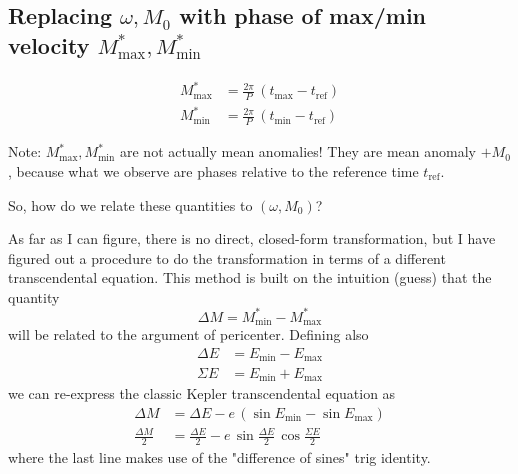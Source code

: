 \documentclass{article}
\begin{document}
\subsection{Replacing $\omega, M_0$ with phase of max/min velocity
$M^*_{\mathrm{max}}, M^*_{\mathrm{min}}$}

\begin{align}
M^*_{\mathrm{max}} &= \frac{2\pi}{P} \, (t_{\mathrm{max}} - t_{\mathrm{ref}}) \\
M^*_{\mathrm{min}} &= \frac{2\pi}{P} \, (t_{\mathrm{min}} - t_{\mathrm{ref}})
\end{align}

Note: $M^*_{\mathrm{max}}, M^*_{\mathrm{min}}$ are not actually mean anomalies!
They are mean anomaly $+ M_0$, because what we observe are phases relative to
the reference time $t_{\mathrm{ref}}$.

So, how do we relate these quantities to $(\omega, M_0)$?

As far as I can figure, there is no direct, closed-form transformation, but I
have figured out a procedure to do the transformation in terms of a different
transcendental equation. This method is built on the intuition (guess) that the
quantity
\begin{equation}
    \Delta M = M^*_{\mathrm{min}} - M^*_{\mathrm{max}}
\end{equation}
will be related to the argument of pericenter. Defining also
\begin{align}
    \Delta E &= E_{\mathrm{min}} - E_{\mathrm{max}} \\
    \Sigma E &= E_{\mathrm{min}} + E_{\mathrm{max}}
\end{align}
we can re-express the classic Kepler transcendental equation as
\begin{align}
    \Delta M &= \Delta E - e\, (\sin E_{\mathrm{min}} - \sin E_{\mathrm{max}})\\
    \frac{\Delta M}{2} &= \frac{\Delta E}{2} - e\, \sin\frac{\Delta E}{2} \, \cos\frac{\Sigma E}{2}
\end{align}
where the last line makes use of the "difference of sines" trig identity.
\end{document}
